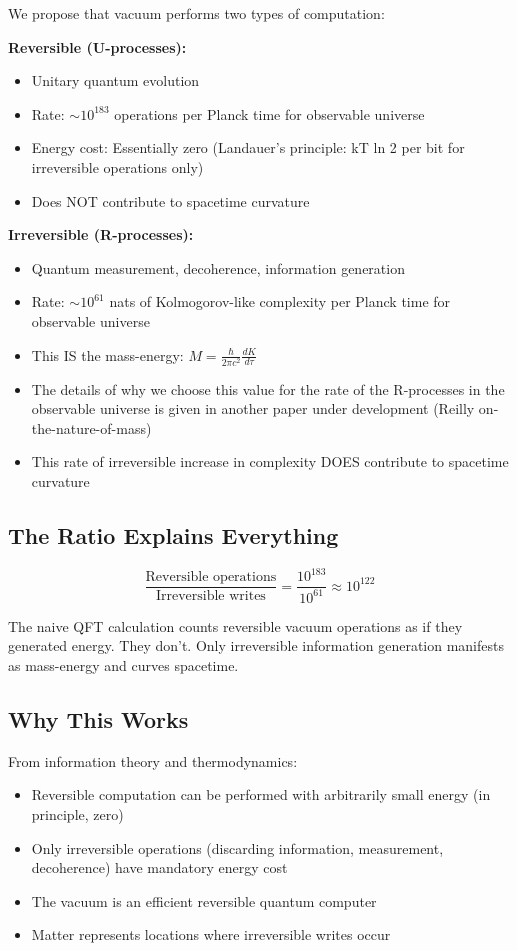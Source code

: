 ﻿\documentclass{article}
\begin{document}
We propose that vacuum performs two types of computation:


\textbf{Reversible (U-processes):}
\begin{itemize}
\item Unitary quantum evolution
\item Rate: $\sim 10^{183}$ operations per Planck time for observable universe
\item Energy cost: Essentially zero (Landauer's principle: kT ln 2 per bit for irreversible operations only)
\item Does NOT contribute to spacetime curvature
\end{itemize}


\textbf{Irreversible (R-processes):}
\begin{itemize}
\item Quantum measurement, decoherence, information generation
\item Rate: $\sim 10^{61}$ nats of Kolmogorov-like complexity per Planck time for observable universe
\item This IS the mass-energy: $M = \frac{\hbar}{2\pi c^2}\frac{dK}{d\tau}$
\item The details of why we choose this value for the rate of the R-processes in the observable universe is given in another paper under development (Reilly on-the-nature-of-mass)
\item This rate of  irreversible increase in complexity DOES contribute to spacetime curvature
\end{itemize}


\subsection{The Ratio Explains Everything}


\begin{equation}
\frac{\text{Reversible operations}}{\text{Irreversible writes}} = \frac{10^{183}}{10^{61}} \approx 10^{122}
\end{equation}


The naive QFT calculation counts reversible vacuum operations as if they generated energy. They don't. Only irreversible information generation manifests as mass-energy and curves spacetime.


\subsection{Why This Works}


From information theory and thermodynamics:
\begin{itemize}
\item Reversible computation can be performed with arbitrarily small energy (in principle, zero)
\item Only irreversible operations (discarding information, measurement, decoherence) have mandatory energy cost
\item The vacuum is an efficient reversible quantum computer
\item Matter represents locations where irreversible writes occur
\end{itemize}
\end{document}
